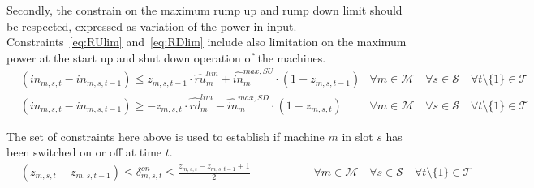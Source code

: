 \documentclass{article}
\newcommand{\cT}{{\mathcal T}}
\newcommand{\cM}{{\mathcal M}}
\newcommand{\cP}{{\mathcal P}}
\newcommand{\cF}{{\mathcal F}}
\newcommand{\cS}{{\mathcal S}}
\begin{document}
{Secondly, the constrain on the maximum rump up and rump down limit should be respected, expressed as variation of the power in input. Constraints~\eqref{eq:RUlim} and~\eqref{eq:RDlim} include also limitation on the maximum power at the start up and shut down operation of the machines. 
		\begin{align}
		& (in_{m,s,t} - in_{m,s,t-1}) \leq  z_{m, s, t-1} \cdot \hat{ru}_{m}^{lim} + \hat{in}_{m}^{max, SU} \cdot (1-z_{m,s,t-1}) & \hspace{0cm} \forall m \in \cM \quad \forall s \in \cS \quad \forall t \setminus\{1\} \in \cT \label{eq:RUlim}\\
		& (in_{m,s,t} - in_{m,s,t-1}) \geq -z_{m,s,t} \cdot \hat{rd}_{m}^{lim} - \hat{in}_{m}^{max, SD} \cdot (1-z_{m,s,t}) & \hspace{0cm} \forall m \in \cM \quad \forall s \in \cS \quad \forall t \setminus\{1\} \in \cT \label{eq:RDlim}
		\end{align}
\begin{comment} 	
		\begin{align}
		& (f_{m,s,t} - f_{m,s,t-1}) \leq \hat{f}_{m}^{RU,lim} & \hspace{5cm} \forall m \in \cF \quad \forall s \in \cS \quad \forall t \setminus\{1\} \in \cT \label{eq:RUlim_f}\\
		& (f_{m,s,t-1} - f_{m,s,t}) \leq \hat{f}_{m}^{RD,lim} & \hspace{5cm} \forall m \in \cF \quad \forall s \in \cS \quad \forall t \setminus\{1\} \in \cT \label{eq:RDlim_f}\\
		& (el_{m,s,t}^{cons} - el_{m,s,t-1}^{cons}) \leq \hat{el}_{m}^{RU,lim} & \hspace{5cm} \forall m \in \cP^- \quad \forall s \in \cS \quad \forall t \setminus\{1\} \in \cT \label{eq:RUlim_el}\\
		& (el_{m,s,t-1}^{cons} - el_{m,s,t}^{cons}) \leq \hat{el}_{m}^{RD,lim} & \hspace{5cm} \forall m \in \cP^- \quad \forall s \in \cS \quad \forall t \setminus\{1\} \in \cT \label{eq:RDlim_el}
		\end{align}	
\end{comment}
The set of constraints here above is used to establish if machine $m$ in slot $s$ has been switched on or off at time $t$. 
		\begin{align}
		& (z_{m,s,t}-z_{m,s,t-1}) \leq \delta_{m,s,t}^{on} \leq \frac{z_{m,s,t}-z_{m,s,t-1} +1}{2} & \hspace{2cm} \forall m \in \cM \quad \forall s \in \cS \quad \forall t \setminus\{1\} \in \cT \label{eq:DeltaOn}\\

\end{align}}
\end{document}
